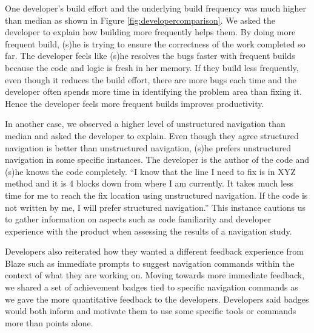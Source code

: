 \documentclass{sig-alternate}
\begin{document}
One developer's build effort and the underlying build frequency was much higher than median as shown in Figure \ref{fig:developercomparison}.  We asked the developer to explain how building more frequently helps them. By doing more frequent build, (s)he is trying to ensure the correctness of the work completed so far. The developer feels like (s)he resolves the bugs faster with frequent builds because the code and logic is fresh in her memory. If they build less frequently, even though it reduces the build effort, there are more bugs each time and the developer often spends more time in identifying the problem area than fixing it. Hence the developer feels more frequent builds improves  productivity.  

In another case, we observed a higher level of unstructured navigation than median and asked the developer to explain.  Even though they agree  structured navigation is better than unstructured navigation, (s)he prefers unstructured navigation in some specific instances. The developer is the author of the code and (s)he knows the code completely. ``I know that the line I need to fix is in XYZ method and it is 4 blocks down from where I am currently. It takes much less time for me to reach the fix location using unstructured navigation. If the code is not written by me, I will prefer structured navigation.'' This instance cautions us to gather information on aspects such as code familiarity and developer experience with the product when assessing the results of a navigation study.


Developers also reiterated how they wanted a different feedback experience from Blaze  such as immediate prompts to suggest navigation commands within the context of what they are working on.  Moving towards more immediate feedback, we shared a set of achievement badges tied to specific navigation commands  as we gave the more quantitative feedback to the developers.   Developers said badges would both inform and motivate them to use some specific tools or commands more than points alone. 
\end{document}
